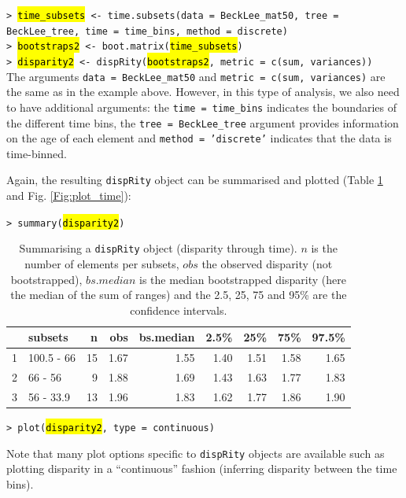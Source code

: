 \documentclass[12pt,letterpaper]{article}
\newcommand{\disp}{\texttt{dispRity} }
\begin{document}
\noindent \texttt{> \hl{time\_subsets} <- time.subsets(data = BeckLee\_mat50, tree = BeckLee\_tree, time = time\_bins, method = \textquotedbl discrete\textquotedbl)}\\
\noindent \texttt{> \hl{bootstraps2} <- boot.matrix(\hl{time\_subsets})}\\
\noindent \texttt{> \hl{disparity2} <- dispRity(\hl{bootstraps2}, metric = c(sum, variances))}\\

\noindent The arguments \texttt{data = BeckLee\_mat50} and \texttt{metric = c(sum, variances)} are the same as in the example above.
However, in this type of analysis, we also need to have additional arguments: the \texttt{time = time\_bins} indicates the boundaries of the different time bins, the \texttt{tree = BeckLee\_tree} argument provides information on the age of each element and \texttt{method = 'discrete'} indicates that the data is time-binned.

Again, the resulting \disp object can be summarised and plotted (Table \ref{Tab:summary_time} and Fig. \ref{Fig:plot_time}):

\noindent \texttt{> summary(\hl{disparity2})}

\begin{table}[ht]
\centering
\begin{tabular}{rlrrrrrrr}
  \hline
 & subsets & n & obs & bs.median & 2.5\% & 25\% & 75\% & 97.5\% \\ 
  \hline
1 & 100.5 - 66 &  15 & 1.67 & 1.55 & 1.40 & 1.51 & 1.58 & 1.65 \\ 
  2 & 66 - 56 &   9 & 1.88 & 1.69 & 1.43 & 1.63 & 1.77 & 1.83 \\ 
  3 & 56 - 33.9 &  13 & 1.96 & 1.83 & 1.62 & 1.77 & 1.86 & 1.90 \\ 
   \hline
\end{tabular}
\caption{Summarising a \disp object (disparity through time). $n$ is the number of elements per subsets, $obs$ the observed disparity (not bootstrapped), $bs.median$ is the median bootstrapped disparity (here the median of the sum of ranges) and the 2.5, 25, 75 and 95\% are the confidence intervals.}
\label{Tab:summary_time}
\end{table}

\noindent \texttt{> plot(\hl{disparity2}, type = \textquotedbl continuous\textquotedbl)}

\noindent Note that many plot options specific to \disp objects are available such as plotting disparity in a ``continuous'' fashion (inferring disparity between the time bins).
\end{document}
